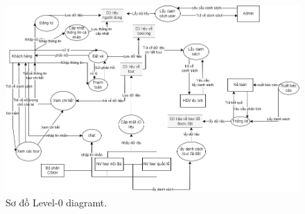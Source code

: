 \begin{figure}[ht]
    \centering
    \includegraphics[width = 1.2\linewidth]{figures/DFD-level0.png}
    \caption{Sơ đồ Level-0 diagramt.}
    \label{fig:example_1}
\end{figure}


